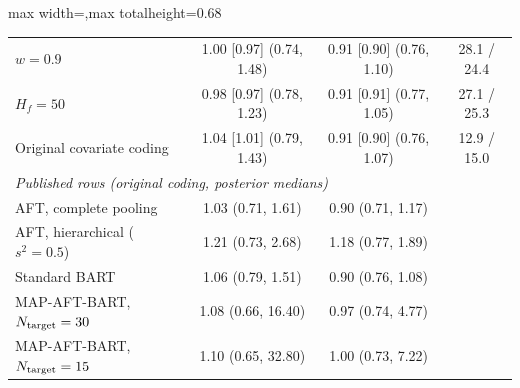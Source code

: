 \begin{table}[htbp]
\begin{adjustbox}{max width=\textwidth,max totalheight=0.68\textheight}
\begin{tabular}{lccc}
$w=0.9$ & 1.00 [0.97] (0.74, 1.48) & 0.91 [0.90] (0.76, 1.10) & 28.1 / 24.4 \\
$H_f=50$ & 0.98 [0.97] (0.78, 1.23) & 0.91 [0.91] (0.77, 1.05) & 27.1 / 25.3 \\
Original covariate coding & 1.04 [1.01] (0.79, 1.43) & 0.91 [0.90] (0.76, 1.07) & 12.9 / 15.0 \\
\midrule
\multicolumn{4}{l}{\textit{Published rows (original coding, posterior medians)}} \\
AFT, complete pooling & 1.03 (0.71, 1.61) & 0.90 (0.71, 1.17) &  \\
AFT, hierarchical ($s^2=0.5$) & 1.21 (0.73, 2.68) & 1.18 (0.77, 1.89) &  \\
Standard BART & 1.06 (0.79, 1.51) & 0.90 (0.76, 1.08) &  \\
MAP-AFT-BART, $N_{\rm target}=30$ & 1.08 (0.66, 16.40) & 0.97 (0.74, 4.77) &  \\
MAP-AFT-BART, $N_{\rm target}=15$ & 1.10 (0.65, 32.80) & 1.00 (0.73, 7.22) &  \\
\bottomrule
\end{tabular}
\end{adjustbox}
\end{table}
